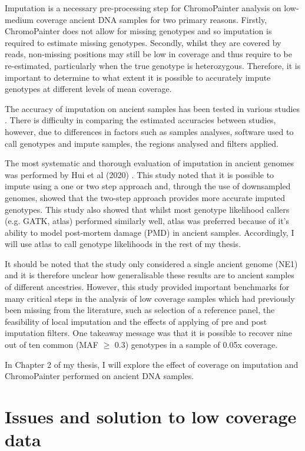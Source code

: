 Imputation is a necessary pre-processing step for ChromoPainter analysis on low-medium coverage ancient DNA samples for two primary reasons. Firstly, ChromoPainter does not allow for missing genotypes and so imputation is required to estimate missing genotypes. Secondly, whilst they are covered by reads, non-missing positions may still be low in coverage and thus require to be re-estimated, particularly when the true genotype is heterozygous. Therefore, it is important to determine to what extent it is possible to accurately impute genotypes at different levels of mean coverage. 

The accuracy of imputation on ancient samples has been tested in various studies \cite{Martiniano2017, hui2020evaluating, EmpiricalAncient}. There is difficulty in comparing the estimated accuracies between studies, however, due to differences in factors such as samples analyses, software used to call genotypes and impute samples, the regions analysed and filters applied. 

The most systematic and thorough evaluation of imputation in ancient genomes was performed by Hui et al (2020) \cite{hui2020evaluating}. This study noted that it is possible to impute using a one or two step approach and, through the use of downsampled genomes, showed that the two-step approach provides more accurate imputed genotypes. This study also showed that whilst most genotype likelihood callers (e.g. GATK, atlas) performed similarly well, atlas was preferred because of it's ability to model post-mortem damage (PMD) in ancient samples. Accordingly, I will use atlas to call genotype likelihoods in the rest of my thesis. 

It should be noted that the study only considered a single ancient genome (NE1) and it is therefore unclear how generalisable these results are to ancient samples of different ancestries. However, this study provided important benchmarks for many critical steps in the analysis of low coverage samples which had previously been missing from the literature, such as selection of a reference panel, the feasibility of local imputation and the effects of applying of pre and post imputation filters. One takeaway message was that it is possible to recover nine out of ten common (MAF $\geq$ 0.3) genotypes in a sample of 0.05x coverage. 

In Chapter 2 of my thesis, I will explore the effect of coverage on imputation and ChromoPainter performed on ancient DNA samples. 

\section{Issues and solution to low coverage data}

